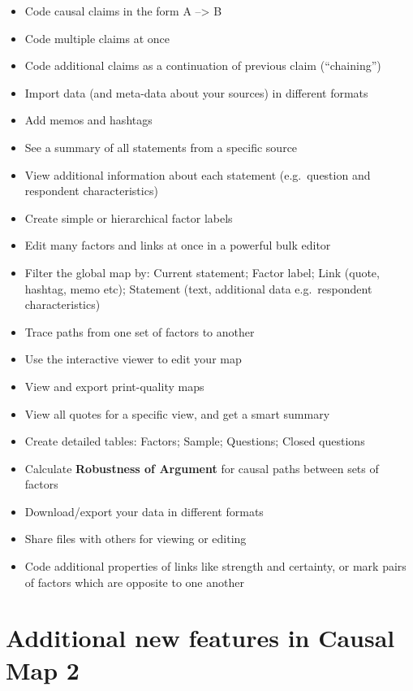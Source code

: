\documentclass[
]{book}
\providecommand{\tightlist}{%
  \setlength{\itemsep}{0pt}\setlength{\parskip}{0pt}}
\begin{document}
\begin{itemize}
\tightlist
\item
  Code causal claims in the form A --\textgreater{} B
\item
  Code multiple claims at once
\item
  Code additional claims as a continuation of previous claim (``chaining'')
\item
  Import data (and meta-data about your sources) in different formats
\item
  Add memos and hashtags
\item
  See a summary of all statements from a specific source
\item
  View additional information about each statement (e.g.~question and respondent characteristics)
\item
  Create simple or hierarchical factor labels
\item
  Edit many factors and links at once in a powerful bulk editor
\item
  Filter the global map by: Current statement; Factor label; Link (quote, hashtag, memo etc); Statement (text, additional data e.g.~respondent characteristics)
\item
  Trace paths from one set of factors to another
\item
  Use the interactive viewer to edit your map
\item
  View and export print-quality maps
\item
  View all quotes for a specific view, and get a smart summary
\item
  Create detailed tables: Factors; Sample; Questions; Closed questions
\item
  Calculate \textbf{Robustness of Argument} for causal paths between sets of factors
\item
  Download/export your data in different formats
\item
  Share files with others for viewing or editing
\item
  Code additional properties of links like strength and certainty, or mark pairs of factors which are opposite to one another
\end{itemize}

\hypertarget{additional-new-features-in-causal-map-2}{%
\section{Additional new features in Causal Map 2}\label{additional-new-features-in-causal-map-2}}
\end{document}
